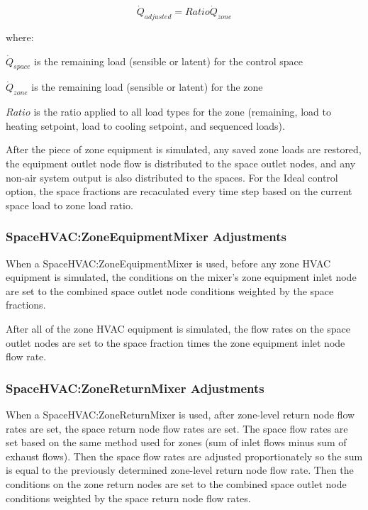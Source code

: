 \begin{equation}
{\dot Q_{adjusted}} = {Ratio}{\dot Q_{zone}}
\label{eq:SpaceHVACLoadAdjustment2}
\end{equation}

where:

${\dot Q_{space}}$ is the remaining load (sensible or latent) for the control space

${\dot Q_{zone}}$ is the remaining load (sensible or latent) for the zone

$Ratio$ is the ratio applied to all load types for the zone (remaining, load to heating setpoint, load to cooling setpoint, and sequenced loads).

After the piece of zone equipment is simulated, any saved zone loads are restored, the equipment outlet node flow is distributed to the space outlet nodes, and any non-air system output is also distributed to the spaces. For the Ideal control option, the space fractions are recaculated every time step based on the current space load to zone load ratio.

\subsubsection{SpaceHVAC:ZoneEquipmentMixer Adjustments}\label{space-hvac-zoneeqmixer-adjustments}
When a SpaceHVAC:ZoneEquipmentMixer is used, before any zone HVAC equipment is simulated, the conditions on the mixer's zone equipment inlet node are set to the combined space outlet node conditions weighted by the space fractions.

After all of the zone HVAC equipment is simulated, the flow rates on the space outlet nodes are set to the space fraction times the zone equipment inlet node flow rate.

\subsubsection{SpaceHVAC:ZoneReturnMixer Adjustments}\label{space-hvac-zoneretmixer-adjustments}
When a SpaceHVAC:ZoneReturnMixer is used, after zone-level return node flow rates are set, the space return node flow rates are set. The space flow rates are set based on the same method used for zones (sum of inlet flows minus sum of exhaust flows). Then the space flow rates are adjusted proportionately so the sum is equal to the previously determined zone-level return node flow rate. Then the conditions on the zone return nodes are set to the combined space outlet node conditions weighted by the space return node flow rates.

